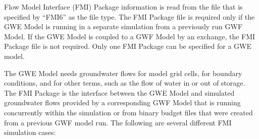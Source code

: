 Flow Model Interface (FMI) Package information is read from the file that is specified by ``FMI6'' as the file type.  The FMI Package file is required only if the GWE Model is running in a separate simulation from a previously run GWF Model. If the GWE Model is coupled to a GWF Model by an exchange, the FMI Package file is not required. Only one FMI Package can be specified for a GWE model.

The GWE Model needs groundwater flows for model grid cells, for boundary conditions, and for other terms, such as the flow of water in or out of storage.  The FMI Package is the interface between the GWE Model and simulated groundwater flows provided by a corresponding GWF Model that is running concurrently within the simulation or from binary budget files that were created from a previous GWF model run.  The following are several different FMI simulation cases:

